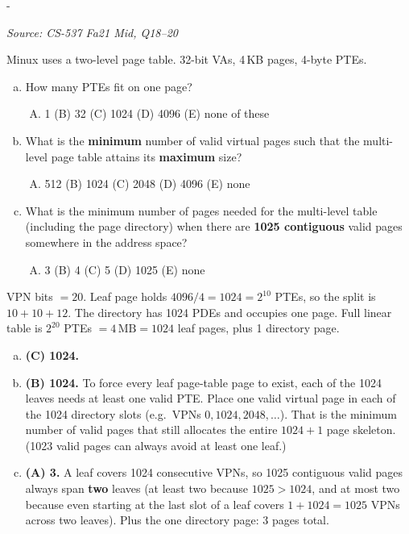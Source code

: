 \documentclass[11pt,a4paper]{article}
\makeatletter
\newcommand{\keepspace}[1]{\par\penalty-100\begingroup
  \setlength{\dimen@}{#1}\dimen@ii\pagegoal\advance\dimen@ii-\pagetotal
  \ifdim\dimen@>\dimen@ii\ifdim\dimen@ii>\z@\vfil\fi\break\fi\endgroup}
\newcounter{qn}[section]
\newenvironment{Qn}[4]{%
  \refstepcounter{qn}\keepspace{7\baselineskip}%
  \begin{tcolorbox}[qboxstyle, title={Q\thesection.\theqn\ \ [#1 \textbar\ #2]\ \ #4}]%
  {\footnotesize\color{g3}\textit{Source: #3}}\par\smallskip%
}{%
  \end{tcolorbox}%
}
\newenvironment{Sol}{%
  \begin{tcolorbox}[sboxstyle, title={Solution}]%
}{%
  \end{tcolorbox}\vspace{0.35em}%
}
\makeatother
\begin{document}
\begin{Qn}{Medium-Hard}{Lect 14}{CS-537 Fa21 Mid, Q18--20}{PTEs per page; min valid pages for a max-size two-level table}
Minux uses a two-level page table. 32-bit VAs, 4\,KB pages, 4-byte PTEs.
\begin{enumerate}[(a)]
\item How many PTEs fit on one page?
\begin{enumerate}[(A)]
\item 1 \quad (B) 32 \quad (C) 1024 \quad (D) 4096 \quad (E) none of these
\end{enumerate}
\item What is the \textbf{minimum} number of valid virtual pages such
      that the multi-level page table attains its \textbf{maximum} size?
\begin{enumerate}[(A)]
\item 512 \quad (B) 1024 \quad (C) 2048 \quad (D) 4096 \quad (E) none
\end{enumerate}
\item What is the minimum number of pages needed for the multi-level
      table (including the page directory) when there are \textbf{1025
      contiguous} valid pages somewhere in the address space?
\begin{enumerate}[(A)]
\item 3 \quad (B) 4 \quad (C) 5 \quad (D) 1025 \quad (E) none
\end{enumerate}
\end{enumerate}
\end{Qn}
\begin{Sol}
VPN bits $=20$. Leaf page holds $4096/4=1024=2^{10}$ PTEs, so the split
is $10+10+12$. The directory has 1024 PDEs and occupies one page. Full
linear table is $2^{20}$ PTEs $= 4\,\mathrm{MB} = 1024$ leaf pages, plus
1 directory page.
\begin{enumerate}[(a)]
\item \textbf{(C) 1024.}
\item \textbf{(B) 1024.} To force every leaf page-table page to exist,
      each of the 1024 leaves needs at least one valid PTE. Place one
      valid virtual page in each of the 1024 directory slots (e.g.\ VPNs
      $0, 1024, 2048, \ldots$). That is the minimum number of valid
      pages that still allocates the entire $1024+1$ page skeleton.
      (1023 valid pages can always avoid at least one leaf.)
\item \textbf{(A) 3.} A leaf covers 1024 consecutive VPNs, so 1025
      contiguous valid pages always span \textbf{two} leaves (at least
      two because $1025>1024$, and at most two because even starting at
      the last slot of a leaf covers $1+1024=1025$ VPNs across two
      leaves). Plus the one directory page: 3 pages total.
\end{enumerate}
\end{Sol}
\end{document}
